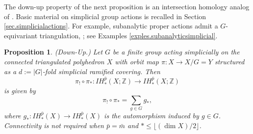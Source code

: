 \documentclass{amsart}
\newtheorem{prop}[thm]{Proposition}
\theoremstyle{definition}
\theoremstyle{remark}
\newcommand {\intg}  {\ensuremath{\mathbb{Z}}}
\newcommand {\bp}    {{\ensuremath{\bar{p}}}}
\newcommand {\bm}    {{\ensuremath{\bar{m}}}}
\begin{document}
The down-up property of the next proposition is an intersection homology
analog of \cite[Prop. 2.4, p.493]{smithlarry}. Basic material on simplicial group
actions is recalled in Section \ref{sec.simplicialactions}.
For example, subanalytic proper actions admit a $G$-equivariant triangulation,
\cite[Prop. 6.7]{blp}; see Examples \ref{exples.subanalyticsimplicial}.
\begin{prop} \label{prop.downupsumofgstar}
(Down-Up.)
Let $G$ be a finite group acting simplicially on the connected 
triangulated polyhedron $X$
with orbit map $\pi: X \to X/G = Y$ structured as a $d:= |G|$-fold
simplicial ramified covering. Then
\[   \pi_! \circ \pi_*: IH^\bp_* (X;\intg) \to IH^\bp_* (X;\intg) \]
is given by
\[ \pi_! \circ \pi_* = \sum_{g\in G} g_*, \]
where $g_*: IH^\bp_* (X) \to IH^\bp_* (X)$ is the automorphism induced
by $g\in G$.
Connectivity is not required when
$\bp = \bm$ and $* \leq \lfloor (\dim X)/2 \rfloor$.
\end{prop}
\end{document}
